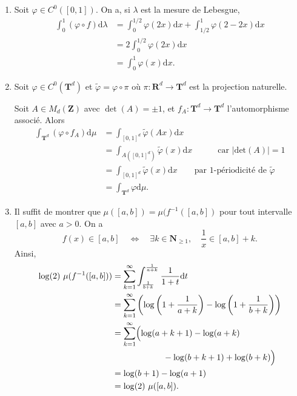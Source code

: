 \documentclass[a4paper,12pt,openany]{article}
\theoremstyle{plain}
\theoremstyle{definition}
\newcommand{\dd}{\mathrm{d}}
\newcommand{\T}{\mathbf{T}}
\newcommand{\R}{\mathbf{R}}
\newcommand{\Z}{\mathbf{Z}}
\newcommand{\N}{\mathbf{N}}
\begin{document}
\begin{enumerate}
\item Soit $\varphi \in C^0([0,1]).$ On a, si $\lambda$ est la mesure de Lebesgue,
$$
\begin{aligned}
\int_0^1 (\varphi \circ f) \dd \lambda &= \int_0^{1/2} \varphi(2x) \dd x + \int_{1/2}^1 \varphi(2-2x) \dd x  \\
&= 2 \int_0^{1/2} \varphi(2x) \dd x  \\
&= \int_0^1 \varphi(x) \dd x.
\end{aligned}
$$

\item  Soit $\varphi \in C^0(\T^d)$ et $\tilde \varphi = \varphi \circ \pi$ o\`u $\pi : \R^d \to \T^d$ est la projection naturelle.



Soit $A \in M_d(\Z)$ avec $\det(A) = \pm 1$, et $f_A : \T^d \to \T^d$ l'automorphisme associ\'e.  Alors 
$$
\begin{aligned}
\int_{\T^d} (\varphi \circ f_A) \dd \mu &= \int_{[0,1]^d} \tilde \varphi(Ax) \dd x  \\
&= \int_{A([0,1]^d)} \tilde \varphi(x) \dd x \quad \quad \quad \text{car }|\mathrm{det}(A)| = 1  \\
&= \int_{[0,1]^d} \tilde \varphi(x) \dd x \quad \quad \text{par $1$-p\'eriodicit\'e de } \tilde \varphi  \\
&= \int_{\T^d} \varphi \dd \mu.
\end{aligned}
$$

\item  Il suffit de montrer que $\mu([a,b]) = \mu(f^{-1}([a,b])$ pour tout intervalle $[a,b]$ avec $a>0$.
On a 
$$
f(x) \in [a,b] \quad \iff \quad \exists k \in \N_{\geqslant 1},\quad  \frac{1}{x} \in [a,b] + k.
$$
Ainsi,
$$
\begin{aligned}
\log(2) ~\mu(f^{-1}([a,b])) &= \sum_{k=1}^\infty \int_{\frac{1}{b+k}}^{\frac{1}{a+k}} \frac{1}{1+t} \dd t  \\
&= \sum_{k=1}^\infty \left(\log\left(1 + \frac{1}{a+k}\right) - \log\left(1 + \frac{1}{b+k}\right)\right)  \\
&= \sum_{k=1}^\infty \Bigl(\log(a+k+1)- \log(a+k) \\
&\quad \quad \quad \quad \quad \quad - \log(b+k+1) + \log(b+k) \Bigr)  \\
&= \log(b+1) - \log(a+1)  \\
&= \log(2)~ \mu([a,b]).
\end{aligned}
$$


\end{enumerate}
\end{document}
